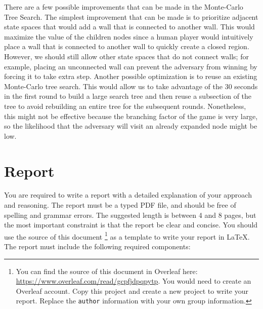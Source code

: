 \documentclass[twoside,11pt]{article}
\begin{document}
There are a few possible improvements that can be made in the Monte-Carlo Tree Search.
The simplest improvement that can be made is to prioritize adjacent state spaces that would add a wall that is connected to another wall.
This would maximize the value of the children nodes since a human player would intuitively place a wall that is connected to another wall to quickly create a closed region.
However, we should still allow other state spaces that do not connect walls;
for example, placing an unconnected wall can prevent the adversary from winning by forcing it to take extra step.
Another possible optimization is to reuse an existing Monte-Carlo tree search.
This would allow us to take advantage of the 30 seconds in the first round to build a large search tree and then reuse a subsection of the tree to avoid rebuilding an entire tree for the subsequent rounds.
Nonetheless, this might not be effective because the branching factor of the game is very large, so the likelihood that the adversary will visit an already expanded node might be low. 

\section{Report}

You are required to write a report with a detailed explanation of your approach and reasoning. The report must be a typed PDF file, and should be free of spelling and grammar errors. The suggested length is between 4 and 8 pages, but the most important constraint is that the report be clear and concise. You should use the source of this document \footnote{You can find the source of this document in Overleaf here: \href{https://www.overleaf.com/read/gcpfjdpqpytp}{https://www.overleaf.com/read/gcpfjdpqpytp}. You would need to create an Overleaf account. Copy this project and create a new project to write your report. Replace the \texttt{author} information with your own group information.} as a template to write your report in \LaTeX.  The report must include the following required components:
\end{document}
